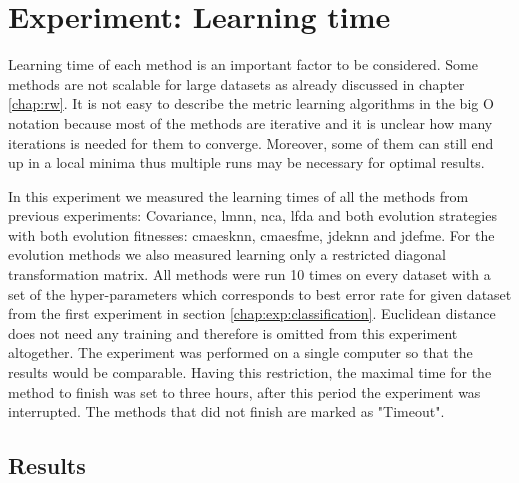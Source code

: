 \documentclass[12pt,a4paper]{report}
\begin{document}
\section{Experiment: Learning time} \label{chap:exp:learning-times}

Learning time of each method is an important factor to be considered. Some methods are not scalable for large datasets as already discussed in chapter \ref{chap:rw}. It is not easy to describe the metric learning algorithms in the big O notation because most of the methods are iterative and it is unclear how many iterations is needed for them to converge. Moreover, some of them can still end up in a local minima thus multiple runs may be necessary for optimal results.

In this experiment we measured the learning times of all the methods from previous experiments: Covariance, \ac{lmnn}, \ac{nca}, \ac{lfda} and both evolution strategies with both evolution fitnesses: \ac{cmaesknn}, \ac{cmaesfme}, \ac{jdeknn} and \ac{jdefme}. For the evolution methods we also measured learning only a restricted diagonal transformation matrix. All methods were run 10 times on every dataset with a set of the hyper-parameters which corresponds to best error rate for given dataset from the first experiment in section \ref{chap:exp:classification}. Euclidean distance does not need any training and therefore is omitted from this experiment altogether. The experiment was performed on a single computer so that the results would be comparable. Having this restriction, the maximal time for the method to finish was set to three hours, after this period the experiment was interrupted. The methods that did not finish are marked as "Timeout".

\subsection{Results}
\end{document}
